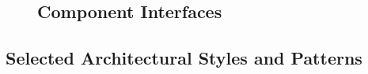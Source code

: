 \documentclass[12pt,titlepage]{article}
\begin{document}
\begin{figure}
\subsection{Component Interfaces}
\centering
{}
\end{figure}
\clearpage
\newpage
\subsection{Selected Architectural Styles and Patterns}
\end{document}
